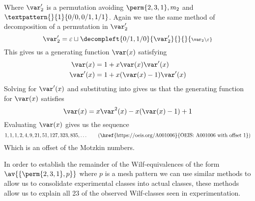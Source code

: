 Where \(\scriptvar^\prime_2\) is a permutation avoiding \(\perm{2,3,1}, m_2\)
and \(\textpattern{}{1}{0/0,0/1,1/1}\).
Again we use the same method of decomposition of a permutation in \(\scriptvar^\prime_2\)
\begin{equation*}
    \scriptvar^\prime_2 = \varepsilon \sqcup
    \decompleft{0/1,1/0}{\scriptvar^\prime_2}{}{}{\scriptstyle \scriptvar_2\setminus\varepsilon}
\end{equation*}
This gives us a generating function \(\var(x)\) satisfying
\begin{align}
    \var(x) &= 1 + x\var(x)\var^\prime(x) \label{eqn:Pgen}\\
    \var^\prime(x) &= 1 + x(\var(x)-1)\var^\prime(x)\label{eqn:PprimeGen}
\end{align}
Solving  for \(\var^\prime(x)\) and substituting into
 gives us that the generating function for
\(\var(x)\) satisfies
\begin{equation}
    \var(x) = x\var^2(x) - x(\var(x) - 1) + 1
\end{equation}
Evaluating \(\var(x)\) gives us the sequence
\begin{equation*}
    1, 1, 1, 2, 4, 9, 21, 51, 127, 323, 835,\dotsc \tag{\href{https://oeis.org/A001006}{OEIS: A001006 with offset 1}}
\end{equation*}
Which is an offset of the Motzkin numbers.

In order to establish the remainder of the Wilf-equivalences of the form \(\av{\{\perm{2,3,1},p\}}\) where \(p\)
is a mesh pattern we can use similar methods to allow us to consolidate experimental classes into
actual classes, these methods allow us to explain all 23 of the observed Wilf-classes seen in experimentation.
